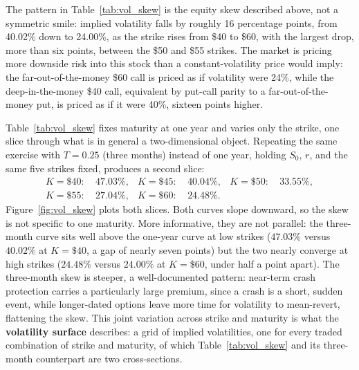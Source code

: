 \documentclass[../ai_in_finance]{subfiles}
\begin{document}
The pattern in Table~\ref{tab:vol_skew} is the equity skew described above, not a symmetric smile: implied volatility falls by roughly 16 percentage points, from 40.02\% down to 24.00\%, as the strike rises from \$40 to \$60, with the largest drop, more than six points, between the \$50 and \$55 strikes. The market is pricing more downside risk into this stock than a constant-volatility price would imply: the far-out-of-the-money \$60 call is priced as if volatility were 24\%, while the deep-in-the-money \$40 call, equivalent by put-call parity to a far-out-of-the-money put, is priced as if it were 40\%, sixteen points higher.

Table~\ref{tab:vol_skew} fixes maturity at one year and varies only the strike, one slice through what is in general a two-dimensional object. Repeating the same exercise with $T=0.25$ (three months) instead of one year, holding $S_0$, $r$, and the same five strikes fixed, produces a second slice:
\begin{align*}
K=\$40: &\ 47.03\%, & K=\$45: &\ 40.04\%, & K=\$50: &\ 33.55\%, \\
K=\$55: &\ 27.04\%, & K=\$60: &\ 24.48\%. & &
\end{align*}
Figure~\ref{fig:vol_skew} plots both slices. Both curves slope downward, so the skew is not specific to one maturity.
More informative, they are not parallel: the three-month curve sits well above the one-year curve at low strikes ($47.03\%$ versus $40.02\%$ at $K=\$40$, a gap of nearly seven points) but the two nearly converge at high strikes ($24.48\%$ versus $24.00\%$ at $K=\$60$, under half a point apart). The three-month skew is steeper, a well-documented pattern: near-term crash protection carries a particularly large premium, since a crash is a short, sudden event, while longer-dated options leave more time for volatility to mean-revert, flattening the skew.
This joint variation across strike and maturity is what the \textbf{volatility surface} describes: a grid of implied volatilities, one for every traded combination of strike and maturity, of which Table~\ref{tab:vol_skew} and its three-month counterpart are two cross-sections.
\end{document}
